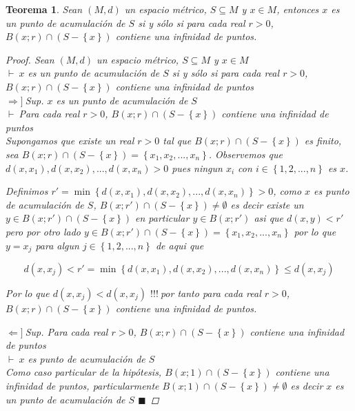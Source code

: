 \documentclass[oneside]{book} %
\theoremstyle{Teorema}
\newtheorem{Teorema}[Definicion]{Teorema}
\theoremstyle{Ejemplos}
\theoremstyle{[Obs]}
\renewcommand{\{}{\left\lbrace} %
\renewcommand{\}}{\right\rbrace} %
\newcommand{\n}{\cap} %
\renewcommand{\sc}{\subseteq} %
\renewcommand{\qed}{$\blacksquare$} %
\newcommand{\pd}{$\vdash\ $} %
\renewcommand{\c}{$!!!\ $} %
\newcommand{\necesidad}{$\Rightarrow]\ $} %
\newcommand{\suficiencia}{$\Leftarrow]\ $} %
\begin{document}
			\begin{Teorema}\setlength{\parindent}{0em}
			
				Sean $(M, d)$ un espacio métrico, $S \sc M$ y $x \in M$, entonces $x$ es un punto de acumulación de $S$ si y sólo si para cada real $r > 0$, $B(x;r) \n (S - \{ x \})$ contiene una infinidad de puntos.

				\begin{proof}
					
					Sean $(M, d)$ un espacio métrico, $S \sc M$ y $x \in M$ \\ 
					\pd $x$ es un punto de acumulación de $S$ si y sólo si para cada real $r > 0$, $B(x;r) \n (S - \{ x \})$ contiene una infinidad de puntos \\ 
					\necesidad Sup. $x$ es un punto de acumulación de $S$ \\ 
					\pd Para cada real $r > 0$, $B(x;r) \n (S - \{ x \})$ contiene una infinidad de puntos \\ 
					Supongamos que existe un real $r >0$ tal que $B(x;r) \n (S - \{ x \})$ es finito, sea $B(x;r) \n (S - \{ x \}) = \{ x_1, x_2, ..., x_n \}$. Observemos que $d(x, x_1), d(x, x_2), ..., d(x, x_n) > 0$ pues ningun $x_i$ con $i \in \{ 1, 2, ..., n \}$ es $x$. 
					
					Definimos $r' = \min\{ d(x, x_1), d(x, x_2), ..., d(x, x_n) \} > 0$, como $x$ es punto de acumulación de $S$, $B(x;r') \n (S - \{ x \}) \neq \emptyset$ es decir existe un $y \in B(x;r') \n (S - \{ x \})$ en particular $y \in B(x;r')$ asi que $d(x, y) < r'$ pero por otro lado $y \in B(x;r') \n (S - \{ x \}) = \{ x_1, x_2, ..., x_n \}$ por lo que $y = x_j$ para algun $j \in \{ 1, 2, ..., n \}$ de aqui que 

					\[ d(x, x_j) < r' = \min\{ d(x, x_1), d(x, x_2), ..., d(x, x_n) \} \leq d(x, x_j) \]
	
					Por lo que $d(x, x_j) < d(x, x_j)$ \c por tanto para cada real $r > 0$, $B(x;r) \n (S - \{ x \})$ contiene una infinidad de puntos.

					\suficiencia Sup. Para cada real $r > 0$, $B(x;r) \n (S - \{ x \})$ contiene una infinidad de puntos \\ 
					\pd $x$ es punto de acumulación de $S$ \\ 
					Como caso particular de la hipótesis, $B(x;1) \n (S - \{ x \})$ contiene una infinidad de puntos, particularmente $B(x;1) \n (S - \{ x \}) \neq \emptyset$ es decir $x$ es un punto de acumulación de $S$ \qed

				\end{proof}
			
			\end{Teorema}
\end{document}
